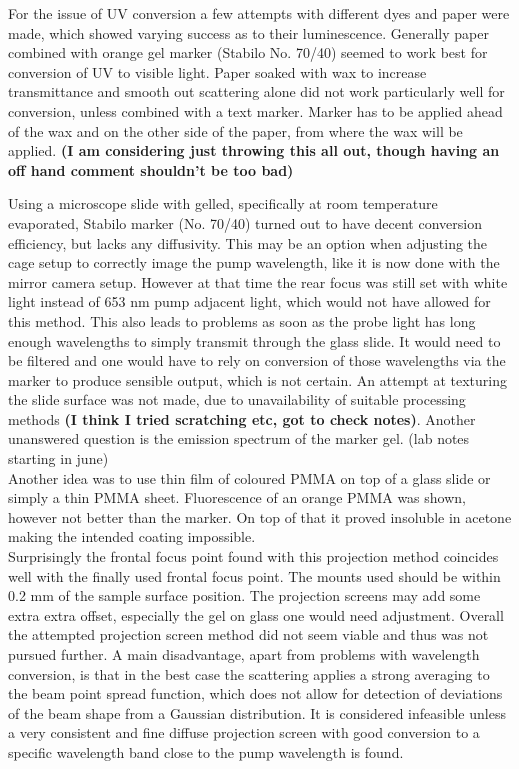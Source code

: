 \documentclass[twoside,openright]{scrreprt}
\begin{document}
For the issue of UV conversion a few attempts with different dyes and paper were made, which showed varying success as to their luminescence.
Generally paper combined with orange gel marker (Stabilo No. 70/40) seemed to work best for conversion of UV to visible light.
Paper soaked with wax to increase transmittance and smooth out scattering alone did not work particularly well for conversion, unless combined with a text marker. Marker has to be applied ahead of the wax and on the other side of the paper, from where the wax will be applied. \textbf{(I am considering just throwing this all out, though having an off hand comment shouldn't be too bad) }

Using a microscope slide with gelled, specifically at room temperature evaporated, Stabilo marker (No. 70/40) turned out to have decent conversion efficiency, but lacks any diffusivity.  This may be an option when adjusting the cage setup to correctly image the pump wavelength, like it is now done with the mirror camera setup. However at that time the rear focus was still set with white light instead of 653 nm pump adjacent light, which would not have allowed for this method. This also leads to problems as soon as the probe light has long enough wavelengths to simply transmit through the glass slide. It would need to be filtered and one would have to rely on conversion of those wavelengths via the marker to produce sensible output, which is not certain. An attempt at texturing the slide surface was not made, due to unavailability of suitable processing methods \textbf{(I think I tried scratching etc, got to check notes)}. Another unanswered question is the emission spectrum of the marker gel. (lab notes  starting in june)\\

Another idea was to use thin film of coloured PMMA on top of a glass slide or simply a thin PMMA sheet. Fluorescence of an orange PMMA was shown, however not better than the marker. On top of that it proved insoluble in acetone making the intended coating impossible.\\

Surprisingly the frontal focus point found with this projection method coincides well with the finally used frontal focus point. The mounts used should be within 0.2 mm of the sample surface position. The projection screens may add some extra extra offset, especially the gel on glass one would need adjustment.
Overall the attempted projection screen method did not seem viable and thus was not pursued further. A main disadvantage, apart from problems with wavelength conversion, is that in the best case the scattering applies a strong averaging to the beam point spread function, which does not allow for detection of deviations of the beam shape from a Gaussian distribution. It is considered infeasible unless a very consistent and fine diffuse projection screen with good conversion to a specific wavelength band close to the pump wavelength is found.
\end{document}
